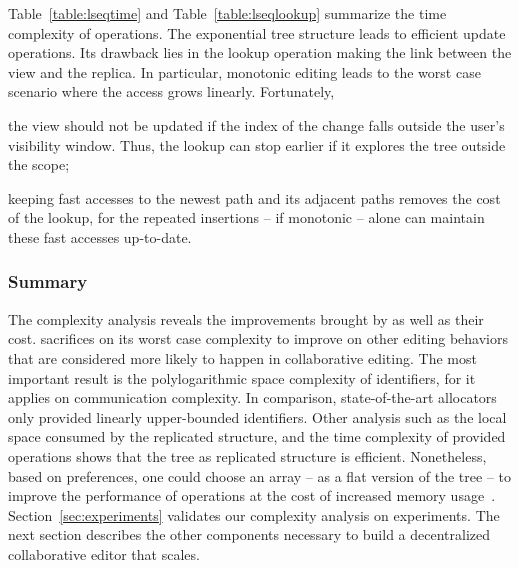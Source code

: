 Table~\ref{table:lseqtime} and Table~\ref{table:lseqlookup} summarize the time
complexity of operations. The exponential tree structure leads to efficient
update operations. Its drawback lies in the lookup operation making the link
between the view and the replica. In particular, monotonic editing leads to the
worst case scenario where the access grows linearly. Fortunately,
\begin{inparaenum}[(i)]
\item the view should not be updated if the index of the change falls outside
  the user's visibility window. Thus, the lookup can stop earlier if it explores
  the tree outside the scope;
\item keeping fast accesses to the newest path and its adjacent paths removes
  the cost of the lookup, for the repeated insertions -- if monotonic -- alone
  can maintain these fast accesses up-to-date.
\end{inparaenum}

\subsubsection{Summary}

The complexity analysis reveals the improvements brought by \LSEQ as well as
their cost.  \LSEQ sacrifices on its worst case complexity to improve on other
editing behaviors that are considered more likely to happen in collaborative
editing. The most important result is the polylogarithmic space complexity of
identifiers, for it applies on communication complexity. In comparison,
state-of-the-art allocators~\cite{preguica2009commutative, weiss2009logoot} only
provided linearly upper-bounded identifiers. Other analysis such as the local
space consumed by the replicated structure, and the time complexity of provided
operations shows that the tree as replicated structure is
efficient. Nonetheless, based on preferences, one could choose an array -- as a
flat version of the tree -- to improve the performance of operations at the cost
of increased memory usage~\cite{weiss2009logoot}.  Section~\ref{sec:experiments}
validates our complexity analysis on experiments. The next section describes the
other components necessary to build a decentralized collaborative editor that
scales.

